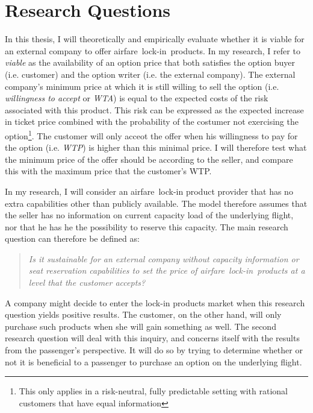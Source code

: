 \chapter{Research Questions}
\label{chap:ResearchQuestions}
In this thesis, I will theoretically and empirically evaluate whether it is viable for an external company to offer airfare~lock-in~products. In my research, I refer to \emph{viable} as the availability of an option price that both satisfies the option buyer (i.e. customer) and the option writer (i.e. the external company). The external company's minimum price at which it is still willing to sell the option (i.e. \emph{willingness to accept} or \emph{WTA}) is equal to the expected costs of the risk associated with this product. This risk can be expressed as the expected increase in ticket price combined with the probability of the costumer not exercising the option\footnote{This only applies in a risk-neutral, fully predictable setting with rational customers that have equal information}. The customer will only acceot the offer when his willingness to pay for the option (i.e. \emph{WTP}) is higher than this minimal price. I will therefore test what the minimum price of the offer should be according to the seller, and compare this with the maximum price that the customer's WTP.

In my research, I will consider an airfare~lock-in product provider that has no extra capabilities other than publicly available. The model therefore assumes that the seller has no information on current capacity load of the underlying flight, nor that he has he the possibility to reserve this capacity. The main research question can therefore be defined as:

\begin{quote}\emph{Is it sustainable for an external company without capacity information or seat reservation capabilities to set the price of airfare~lock-in~products at a level that the customer accepts?}\end{quote}

A company might decide to enter the lock-in products market when this research question yields positive results. The customer, on the other hand, will only purchase such products when she will gain something as well. The second research question will deal with this inquiry, and concerns itself with the results from the passenger's perspective. It will do so by trying to determine whether or not it is beneficial to a passenger to purchase an option on the underlying flight.

